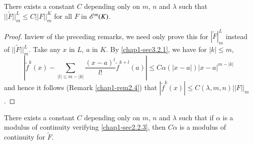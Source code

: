 \begin{Complement}\label{chap1-com3.5}
There exists a constant $C$ depending only on $m$, $n$ and $\lambda$ such that $||\widetilde{F}||^{L}_{m}\leq C||F||^{K}_{m}$ for all $F$ in $\mathscr{E}^{m}(K)$.
\end{Complement}

\begin{proof}
In\pageoriginale view of the preceding remarks, we need only prove this for $|\widetilde{F}|^{L}_{m}$ instead of $||\widetilde{F}||^{L}_{m}$. Take any $x$ in $L$, $a$ in $K$. By \eqref{chap1-sec3.2.1}, we have for $|k|\leq m$,
$$
\left|\widetilde{f}^{k}(x)-\sum\limits_{|l|\leq m-|k|}\dfrac{(x-a)^{l}}{l!}\widetilde{f}^{k+l}(a)\right|\leq C\alpha(|x-a|)|x-a|^{m-|k|}
$$
and hence it follows (Remark \ref{chap1-rem2.4}) that $|\widetilde{f}^{k}(x)|\leq C(\lambda,m,n)||F||_{m}$.
\end{proof}

\begin{Complement}\label{chap1-com3.6}
There exists a constant $C$ depending only on $m$, $n$ and $\lambda$ such that if $\alpha$ is a modulus of continuity verifying \eqref{chap1-sec2.2.3}, then $C\alpha$ is a modulus of continuity for $\widetilde{F}$.
\end{Complement}

